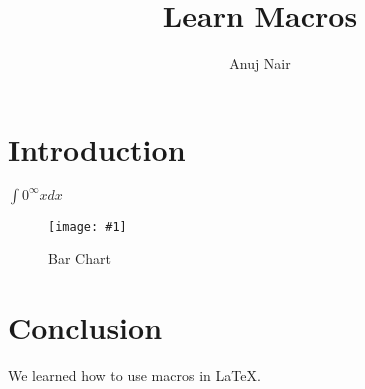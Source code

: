 \documentclass{article}
\title{Learn Macros}
\author{Anuj Nair}
\date{}
\newcommand{\cint}{\int 0^\infty x dx}
\newcommand{\pic}[3]{
	\begin{figure}[htbp]
		\centering
		\texttt{[image: \#1]}
		\caption{#2}
		\label{fig:#3}
	\end{figure}
}
\begin{document}
\maketitle

\section{Introduction}

  $\cint$

	\pic{./1_barChart.png}{Bar Chart}{BarChart}

 
				

\section{Conclusion}
We learned how to use macros in {\LaTeX}.
\end{document}
